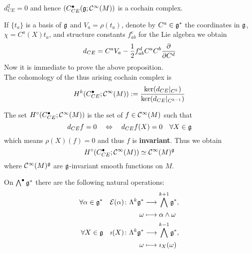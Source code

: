 \begin{prop}
  $d_{CE}^2 = 0$ and hence $(C_{CE}^\bullet(\mathfrak{g} ; \mathcal{C}^{\infty}(M))$ is a cochain complex.
\end{prop}

If $\{t_a\}$ is a basis of $\mathfrak{g}$ and $V_a = \rho(t_a)$, denote by $C^a \in \mathfrak{g}^*$ the coordinates in $\mathfrak{g}$, $\chi= C^a(X) t_a$, and structure constants $f_{ab}^c$ for the Lie algebra we obtain
$$ d_{CE} = C^a V_a - \frac{1}{2} f^d_{ab} C^a C^b \frac{\partial }{\partial C^d} $$
Now it is immediate to prove the above proposition.\\

The cohomology of the thus arising cochain complex is
$$ H^k(C_{CE}^\bullet; \mathcal{C}^{\infty}(M)) := \frac{\ker(d_{CE}|_{C^k})}{\ker(d_{CE}|_{C^{k-1}})} $$

\begin{rem}
  The set $H^\circ (C_{CE}^\bullet; \mathcal{C}^{\infty}(M))$ is the set of $f \in \mathcal{C}^{\infty}(M)$ such that
  $$ d_{CE} f = 0 \quad \Leftrightarrow \quad d_{CE} f(X) = 0 \quad \forall X\in \mathfrak{g} $$
  which means $\rho(X)(f) = 0$ and thus $f$ is \textbf{invariant}. Thus we obtain
  $$ H^\circ (C_{CE}^\bullet; \mathcal{C}^{\infty}(M)) \simeq \mathcal{C}^{\infty}(M)^{\mathfrak{g}} $$
  where $\mathcal{C}^{\infty}(M)^{\mathfrak{g}}$ are $\mathfrak{g}$-invariant smooth functions on $M$.
\end{rem}

On $\bigwedge^\bullet \mathfrak{g}^*$ there are the following natural operations:
\begin{align}
  \forall \alpha \in \mathfrak{g}^* \quad \mathcal{E}(\alpha) \colon \Lambda^k \mathfrak{g}^* &\longrightarrow \bigwedge^{k+1} \mathfrak{g}^*, \\
  \omega &\longmapsto \alpha \wedge \omega \\
  \forall X \in \mathfrak{g} \quad \imath(X) \colon \Lambda^k \mathfrak{g}^* &\longrightarrow \bigwedge^{k-1} \mathfrak{g}^*, \\
  \omega &\longmapsto \imath_X (\omega)
\end{align}

